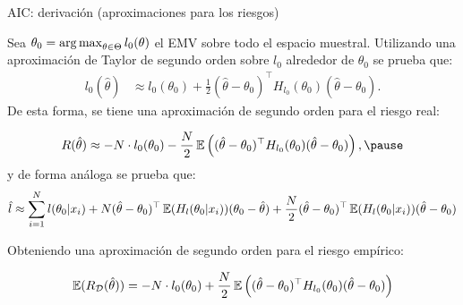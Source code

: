 \documentclass[handout, 9pt]{beamer}
\begin{document}
\begin{frame}{AIC: derivación (aproximaciones para los riesgos)}

Sea $\theta_0 = \operatorname*{arg\,max}_{\theta\in\Theta} l_0(\theta)$ el EMV sobre todo el espacio muestral. Utilizando una aproximación de Taylor de segundo orden sobre $l_0$ alrededor de $\theta_0$ se prueba que:
\begin{align*}
	l_0(\hat{\theta})&\approx l_0(\theta_0) + \frac{1}{2}(\hat{\theta}-\theta_0)^\top H_{l_0}(\theta_0) (\hat{\theta}-\theta_0).
\end{align*}\pause
De esta forma, se tiene una aproximación de segundo orden para el riesgo real:

\begin{equation*}
	R(\hat{\theta}) \approx -N \cdot l_0(\theta_0) - \frac{N}{2}\E\left((\hat{\theta}-\theta_0)^\top H_{l_0}(\theta_0) (\hat{\theta}-\theta_0)\right),\pause
\end{equation*}
y de forma análoga se prueba que:
\begin{equation*}
	\hat{l} \approx \sum_{i=1}^N l(\theta_0|x_i) + N(\hat{\theta}-\theta_0)^\top \operatorname{\mathbb{E}}(H_l(\theta_0|x_i)) (\theta_0-\hat{\theta}) + \frac{N}{2}(\hat{\theta}-\theta_0)^\top \operatorname{\mathbb{E}}(H_l(\theta_0|x_i)) (\hat{\theta}-\theta_0)
\end{equation*}\pause

Obteniendo una aproximación de segundo orden para el riesgo empírico:

\begin{equation*}
	\operatorname{\mathbb{E}}(R_{\mathcal D}(\hat{\theta})) = -N\cdot l_0(\theta_0) + \frac{N}{2} \operatorname{\mathbb{E}}\left((\hat{\theta}-\theta_0)^\top H_{l_0}(\theta_0) (\hat{\theta}-\theta_0)\right)
\end{equation*}

	
\end{frame}
\end{document}
